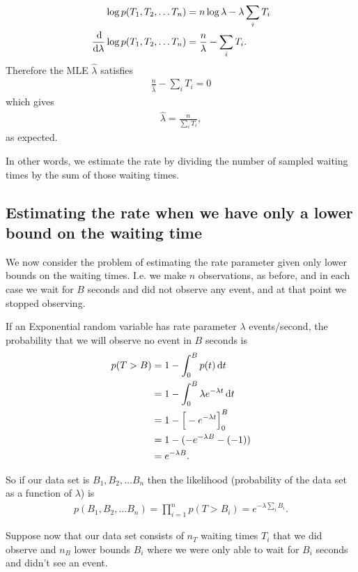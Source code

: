 \documentclass[12pt]{article}
\begin{document}
\begin{align*}
  \log p(T_1, T_2, \ldots T_n) &=  n\log \lambda - \lambda \sum_iT_i \\
  \ddlambda \log p(T_1, T_2, \ldots T_n) &= \frac{n}{\lambda} - \sum_iT_i.
\end{align*}
Therefore the MLE $\hat \lambda$ satisfies
\begin{align*}
 \frac{n}{\hat \lambda} - \sum_iT_i = 0
\end{align*}
which gives
\begin{align*}
  \hat \lambda = \frac{n}{\sum_iT_i},
\end{align*}
as expected.

In other words, we estimate the rate by dividing the number of sampled waiting times by the sum of
those waiting times.


\subsection{Estimating the rate when we have only a lower bound on the waiting time}

We now consider the problem of estimating the rate parameter given only lower bounds on the waiting
times. I.e. we make $n$ observations, as before, and in each case we wait for $B$ seconds
and did not observe any event, and at that point we stopped observing.

If an Exponential random variable has rate parameter $\lambda$ events/second, the probability that we
will observe no event in $B$ seconds is
\begin{align*}
  p(T > B)
  &= 1 - \int_0^B p(t) \dt \\
  &= 1 - \int_0^B \lambda e^{-\lambda t} \dt \\
  &= 1 - \Big[-e^{-\lambda t}\Big]_0^B \\
  &= 1 - (-e^{-\lambda B} - (-1)) \\
  &= e^{-\lambda B}.
\end{align*}

So if our data set is $B_1, B_2, \ldots B_n$ then the likelihood (probability of the data set as a
function of $\lambda$) is
\begin{align*}
  p(B_1, B_2, \ldots B_n) = \prod_{i=1}^n p(T > B_i) = e^{-\lambda \sum_iB_i}.
\end{align*}

Suppose now that our data set consists of $n_T$ waiting times $T_i$ that we did observe and
$n_B$ lower bounds $B_i$ where we were only able to wait for $B_i$ seconds and didn't
see an event.
\end{document}
